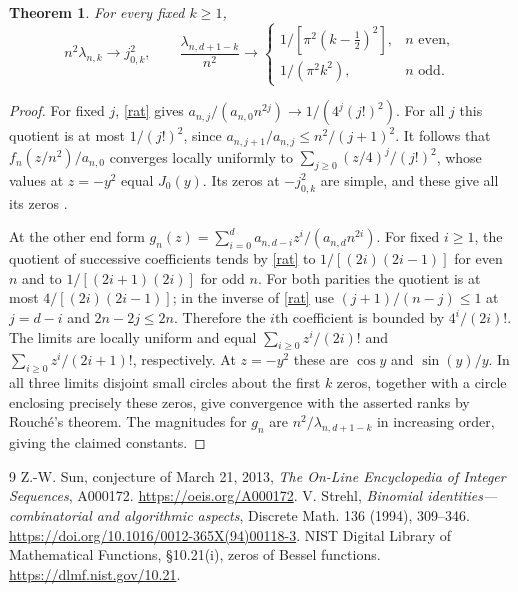 \documentclass[11pt]{article}
\newtheorem{theorem}{Theorem}
\begin{document}
\begin{theorem}\label{extreme}
For every fixed $k\ge1$,
\[
 n^2\lambda_{n,k}\longrightarrow j_{0,k}^2,
 \qquad
 \frac{\lambda_{n,d+1-k}}{n^2}\longrightarrow
 \begin{cases}
 1/[\pi^2(k-\tfrac12)^2],& n\text{ even},\\
 1/(\pi^2 k^2),&n\text{ odd}.
 \end{cases}
\]
\end{theorem}
\begin{proof}
For fixed $j$, \eqref{rat} gives $a_{n,j}/(a_{n,0}n^{2j})\to1/(4^j(j!)^2)$. For all $j$ this quotient is at most $1/(j!)^2$, since $a_{n,j+1}/a_{n,j}\le n^2/(j+1)^2$. It follows that $f_n(z/n^2)/a_{n,0}$ converges locally uniformly to $\sum_{j\ge0}(z/4)^j/(j!)^2$, whose values at $z=-y^2$ equal $J_0(y)$. Its zeros at $-j_{0,k}^2$ are simple, and these give all its zeros \cite{bessel}.

At the other end form $g_n(z)=\sum_{i=0}^d a_{n,d-i} z^i/(a_{n,d}n^{2i})$. For fixed $i\ge1$, the quotient of successive coefficients tends by \eqref{rat} to $1/[(2i)(2i-1)]$ for even $n$ and to $1/[(2i+1)(2i)]$ for odd $n$. For both parities the quotient is at most $4/[(2i)(2i-1)]$; in the inverse of \eqref{rat} use $(j+1)/(n-j)\le1$ at $j=d-i$ and $2n-2j\le2n$. Therefore the $i$th coefficient is bounded by $4^i/(2i)!$. The limits are locally uniform and equal $\sum_{i\ge0}z^i/(2i)!$ and $\sum_{i\ge0}z^i/(2i+1)!$, respectively. At $z=-y^2$ these are $\cos y$ and $\sin(y)/y$. In all three limits disjoint small circles about the first $k$ zeros, together with a circle enclosing precisely these zeros, give convergence with the asserted ranks by Rouch\'e's theorem. The magnitudes for $g_n$ are $n^2/\lambda_{n,d+1-k}$ in increasing order, giving the claimed constants.
\end{proof}
\begin{thebibliography}{9}
 Z.-W. Sun, conjecture of March 21, 2013, \emph{The On-Line Encyclopedia of Integer Sequences}, A000172. \url{https://oeis.org/A000172}.
 V. Strehl, \emph{Binomial identities---combinatorial and algorithmic aspects}, Discrete Math. 136 (1994), 309--346. \url{https://doi.org/10.1016/0012-365X(94)00118-3}.
 NIST Digital Library of Mathematical Functions, \S10.21(i), zeros of Bessel functions. \url{https://dlmf.nist.gov/10.21}.
\end{thebibliography}
\end{document}
